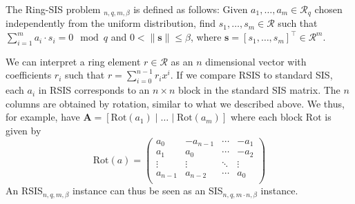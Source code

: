 
\begin{definition}
    The Ring-SIS problem $_{n, q, m, \beta}$ is defined as follows: Given $a_1, \ldots, a_m \in \mathcal{R}_q$ chosen independently from the uniform distribution, find $s_1, \ldots, s_m \in \mathcal{R}$ such that $\sum_{i=1}^m a_i \cdot s_i = 0 \mod q$ and $0 < \| \mathbf{s}\| \leq \beta$, where $\mathbf{s} = \left[s_1, \ldots, s_m\right]^\intercal \in \mathcal{R}^m$.
\end{definition} %
We can interpret a ring element $r \in \mathcal{R}$ as an $n$ dimensional vector with coefficients $r_i$ such that $r = \sum_{i=0}^{n-1} r_i x^i$. If we compare RSIS to standard SIS, each $a_i$ in RSIS corresponds to an $n\times n$ block in the standard SIS matrix. The $n$ columns are obtained by rotation, similar to what we described above. We thus, for example, have $\mathbf{A} = [\text{Rot}(a_1)\mid \dots \mid \text{Rot}(a_m)]$ where each block $\text{Rot}$ is given by
\begin{equation*}
    \text{Rot}(a) = \begin{pmatrix}
        a_0     & -a_{n-1} & \cdots & -a_{1} \\
        a_1     & a_{0}    & \cdots & -a_{2} \\
        \vdots  & \vdots   & \ddots & \vdots \\
        a_{n-1} & a_{n-2}  & \cdots & a_{0}  \\
    \end{pmatrix}
\end{equation*}
An RSIS$_{n, q, m, \beta}$ instance can thus be seen as an SIS$_{n, q, m \cdot n, \beta}$ instance.

